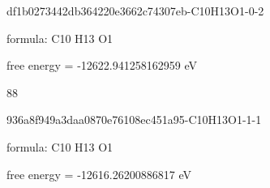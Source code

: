 \documentclass{article}
\begin{document}
\vspace{1cm}


df1b0273442db364220e3662c74307eb-C10H13O1-0-2



formula: C10 H13 O1



free energy = -12622.941258162959 eV

88

\vspace{1cm}


936a8f949a3daa0870e76108ec451a95-C10H13O1-1-1



formula: C10 H13 O1



free energy = -12616.26200886817 eV
\end{document}
